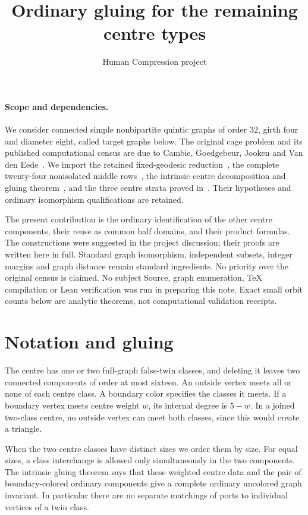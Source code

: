 \documentclass[11pt]{article}
\title{Ordinary gluing for the remaining centre types}
\author{Human Compression project}
\date{}
\begin{document}
\maketitle

\paragraph{Scope and dependencies.}
We consider connected simple nonbipartite quintic graphs of order $32$,
girth four and diameter eight, called target graphs below. The original
cage problem and its published computational census are due to Cambie,
Goedgebeur, Jooken and Van den Eede~\cite{original}. We import the
retained fixed-geodesic reduction~\cite{middle}, the complete twenty-four
nonisolated middle rows~\cite{rows}, the intrinsic centre decomposition
and gluing theorem~\cite{centre}, and the three centre strata proved
in~\cite{halves}. Their hypotheses and ordinary isomorphism qualifications
are retained.

The present contribution is the ordinary identification of the other
centre components, their reuse as common half domains, and their product
formulas. The constructions were suggested in the project discussion;
their proofs are written here in full. Standard graph isomorphism,
independent subsets, integer margins and graph distance remain standard
ingredients. No priority over the original census is claimed. No subject
Source, graph enumeration, TeX compilation or Lean verification was run
in preparing this note. Exact small orbit counts below are analytic
theorems, not computational validation receipts.

\section{Notation and gluing}

The centre has one or two full-graph false-twin classes, and deleting it
leaves two connected components of order at most sixteen. An outside
vertex meets all or none of each centre class. A boundary color specifies
the classes it meets. If a boundary vertex meets centre weight $w$, its
internal degree is $5-w$. In a joined two-class centre, no outside vertex
can meet both classes, since this would create a triangle.

When the two centre classes have distinct sizes we order them by size.
For equal sizes, a class interchange is allowed only simultaneously in
the two components. The intrinsic gluing theorem says that these weighted
centre data and the pair of boundary-colored ordinary components give a
complete ordinary uncolored graph invariant. In particular there are
no separate matchings of ports to individual vertices of a twin class.
\end{document}
